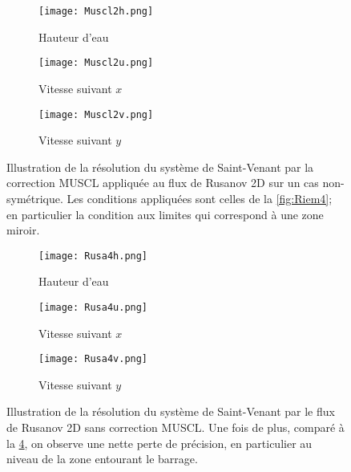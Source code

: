 \documentclass[
	french,
	11pt, %
]{fphw}
\begin{document}
\begin{figure}[H]
	\centering
	\begin{subfigure}{0.32\textwidth}
		\centering
		\texttt{[image: Muscl2h.png]}
		\caption{Hauteur d'eau}
		\label{fig:Muscl2h}
	\end{subfigure}
	\begin{subfigure}{0.32\textwidth}
		\centering
		\texttt{[image: Muscl2u.png]}
		\caption{Vitesse suivant $x$}
		\label{fig:Muscl2u}
	\end{subfigure}
	\begin{subfigure}{0.32\textwidth}
		\centering
		\texttt{[image: Muscl2v.png]}
		\caption{Vitesse suivant $y$}
		\label{fig:Muscl2v}
	\end{subfigure}
	\caption{Illustration de la résolution du système de Saint-Venant par la correction MUSCL appliquée au flux de Rusanov 2D sur un cas non-symétrique. Les conditions appliquées sont celles de la \cref{fig:Riem4}; en particulier la condition aux limites qui correspond à une zone miroir.}
	\label{fig:Muscl2}
\end{figure}


\begin{figure}[H]
	\centering
	\begin{subfigure}{0.32\textwidth}
		\centering
		\texttt{[image: Rusa4h.png]}
		\caption{Hauteur d'eau}
		\label{fig:Rusa4h}
	\end{subfigure}
	\begin{subfigure}{0.32\textwidth}
		\centering
		\texttt{[image: Rusa4u.png]}
		\caption{Vitesse suivant $x$}
		\label{fig:Rusa4u}
	\end{subfigure}
	\begin{subfigure}{0.32\textwidth}
		\centering
		\texttt{[image: Rusa4v.png]}
		\caption{Vitesse suivant $y$}
		\label{fig:Rusa4v}
	\end{subfigure}
	\caption{Illustration de la résolution du système de Saint-Venant par le flux de Rusanov 2D sans correction MUSCL. Une fois de plus, comparé à la \cref{fig:Muscl2}, on observe une nette perte de précision, en particulier au niveau de la zone entourant le barrage.}
	\label{fig:Rusa4}
\end{figure}


\end{document}
